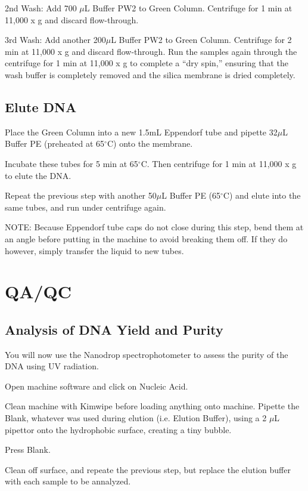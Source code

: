 \documentclass[12pt]{../SOP3_beta}\usepackage[]{graphicx}\usepackage[]{xcolor}
\begin{document}
\NP 2nd Wash: Add 700 $\mu$L Buffer PW2 to Green Column. Centrifuge for 1 min at 11,000 x g and discard flow-through.

\NP 3rd Wash: Add another 200$\mu$L Buffer PW2 to Green Column. Centrifuge for 2 min at 11,000 x g and discard flow-through. Run the samples again through the centrifuge for 1 min at 11,000 x g to complete a ``dry spin,'' ensuring that the wash buffer is completely removed and the silica membrane is dried completely. 

\subsection*{Elute DNA}

\NP Place the Green Column into a new 1.5mL Eppendorf tube and pipette 32$\mu$L Buffer PE (preheated at 65$^\circ$C) onto the membrane. 

\NP Incubate these tubes for 5 min at 65$^\circ$C. Then centrifuge for 1 min at 11,000 x g to elute the DNA.

\NP Repeat the previous step with another 50$\mu$L Buffer PE (65$^\circ$C) and elute into the same tubes, and run under centrifuge again.

\NP NOTE: Because Eppendorf tube caps do not close during this step, bend them at an angle before putting in the machine to avoid breaking them off. If they do however, simply transfer the liquid to new tubes.


\section{QA/QC}

\subsection*{Analysis of DNA Yield and Purity}

\NP You will now use the Nanodrop spectrophotometer to assess the purity of the DNA using UV radiation. 

\NP Open machine software and click on Nucleic Acid.

\NP Clean machine with Kimwipe before loading anything onto machine. 
\NP Pipette the Blank, whatever was used during elution (i.e. Elution Buffer), using a 2 $\mu$L pipettor onto the hydrophobic surface, creating a tiny bubble.

\NP Press Blank.

\NP Clean off surface, and repeate the previous step, but replace the elution buffer with each sample to be annalyzed.
\end{document}
